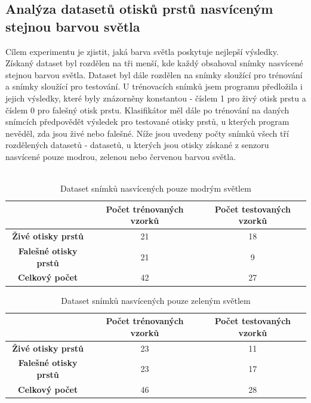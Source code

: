 \subsection{Analýza datasetů otisků prstů nasvíceným stejnou barvou světla}
Cílem experimentu je zjistit, jaká barva světla poskytuje nejlepší výsledky. Získaný dataset byl rozdělen na tři menší, kde každý obsahoval snímky nasvícené stejnou barvou světla. Dataset byl dále rozdělen na snímky sloužící pro trénování a snímky sloužící pro testování. U trénovacích snímků jsem programu předložila i jejich výsledky, které byly znázorněny konstantou - číslem 1 pro živý otisk prstu a číslem 0 pro falešný otisk prstu. Klasifikátor měl dále po trénování na daných snímcích předpovědět výsledek pro testované otisky prstů, u kterých program nevěděl, zda jsou živé nebo falešné. Níže jsou uvedeny počty snímků všech tří rozdělených datasetů - datasetů, u kterých jsou otisky získané z senzoru nasvícené pouze modrou, zelenou nebo červenou barvou světla. \\\

\capstartfalse
\begin{table}[!htbp]
\centering
\begin{tabular}{|c|c|c|}
\hline
\textbf{}                     & \textbf{Počet trénovaných vzorků} & \textbf{Počet testovaných vzorků} \\ \hline
\textbf{Živé otisky prstů}    & 21                                & 18                                \\ \hline
\textbf{Falešné otisky prstů} & 21                                & 9                                \\ \hline
\textbf{Celkový počet}               & 42                                & 27                                \\ \hline
\end{tabular}
\caption{Dataset snímků nasvícených pouze modrým světlem}
\end{table}
\capstarttrue

\capstartfalse
\begin{table}[!htbp]
\centering
\begin{tabular}{|c|c|c|}
\hline
\textbf{}                     & \textbf{Počet trénovaných vzorků} & \textbf{Počet testovaných vzorků} \\ \hline
\textbf{Živé otisky prstů}    & 23                                & 11                                \\ \hline
\textbf{Falešné otisky prstů} & 23                                & 17                                \\ \hline
\textbf{Celkový počet}               & 46                                & 28                                \\ \hline
\end{tabular}
\caption{Dataset snímků nasvícených pouze zeleným světlem}
\end{table}
\capstarttrue

